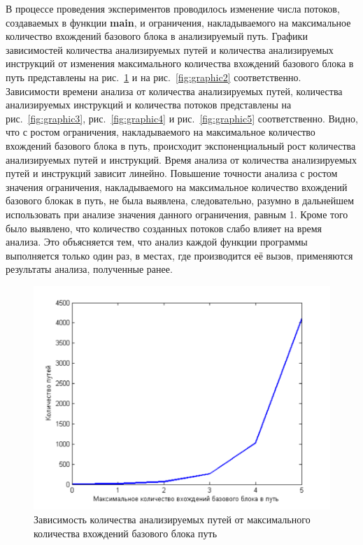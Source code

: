 

В процессе проведения экспериментов проводилось изменение числа потоков, создаваемых в функции \textbf{main}, и ограничения, накладываемого на максимальное количество вхождений базового блока в анализируемый путь. Графики зависимостей количества анализируемых путей и количества анализируемых инструкций от изменения максимального количества вхождений базового блока в путь представлены на рис.~\ref{fig:graphic1} и на рис.~\ref{fig:graphic2} соответственно. Зависимости времени анализа от количества анализируемых путей, количества анализируемых инструкций и количества потоков представлены на рис.~\ref{fig:graphic3}, рис.~\ref{fig:graphic4} и рис.~\ref{fig:graphic5} соответственно. Видно, что с ростом ограничения, накладываемого на максимальное количество вхождений базового блока в путь, происходит экспоненциальный рост количества анализируемых путей и инструкций. Время анализа от количества анализируемых путей и инструкций зависит линейно. Повышение точности анализа с ростом значения ограничения, накладываемого на максимальное количество вхождений базового блокак в путь, не была выявлена, следовательно, разумно  в дальнейшем использовать при анализе значения данного ограничения, равным 1. Кроме того было выявлено, что количество созданных потоков слабо влияет на время анализа. Это объясняется тем, что анализ каждой функции программы выполняется только один раз, в местах, где производится её вызов, применяются результаты анализа, полученные ранее.

\begin{figure}
  \centering
  \includegraphics[width=\textwidth]{inc/png/graphic1}
  \caption{Зависимость количества анализируемых путей от максимального количества вхождений базового блока путь}
  \label{fig:graphic1}
\end{figure}

